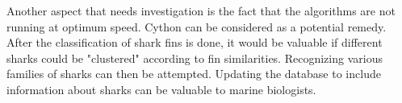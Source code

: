 \documentclass[a4paper,10pt]{article}
\begin{document}
Another aspect that needs investigation is the fact that the algorithms are not
running at optimum speed.  Cython can be considered
as a potential remedy. \\

After the classification of shark fins is done, it would be valuable if different sharks could be "clustered" according to fin similarities.
Recognizing various families of sharks can then be attempted.  Updating the database to include information about sharks can be valuable to marine biologists.  \\

\newpage

\end{document}
